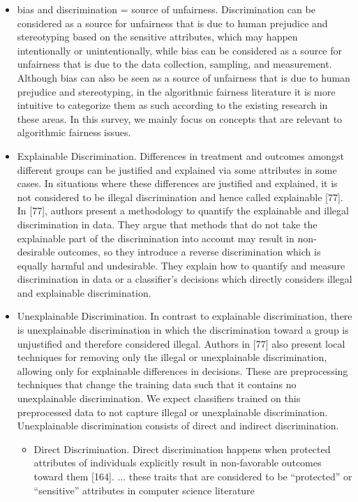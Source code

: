 \documentclass[12pt, a4paper, oneside]{book}   	%
\begin{document}
			\begin{itemize}
				\item bias and discrimination = source of unfairness. Discrimination can be considered as a source for unfairness that is due to human prejudice and stereotyping based on the sensitive attributes, which may happen intentionally or unintentionally, while bias can be considered as a source for unfairness that is due to the data collection, sampling, and measurement. Although bias can also be seen as a source of unfairness that is due to human prejudice and stereotyping, in the algorithmic fairness literature it is more intuitive to categorize them as such according to the existing research in these areas. In this survey, we mainly focus on concepts that are relevant to algorithmic fairness issues. \autocite{Mehrabi_2021}
				\item Explainable Discrimination. Differences in treatment and outcomes amongst different groups can be justified and explained via some attributes in some cases. In situations where these differences are justified and explained, it is not considered to be illegal discrimination and hence called explainable [77]. In [77], authors present a methodology to quantify the explainable and illegal discrimination in data. They argue that methods that do not take the explainable part of the discrimination into account may result in non-desirable outcomes, so they introduce a reverse discrimination which is equally harmful and undesirable. They explain how to quantify and measure discrimination in data or a classifier’s decisions which directly considers illegal and explainable discrimination.\autocite{Mehrabi_2021}
				\item Unexplainable Discrimination. In contrast to explainable discrimination, there is unexplainable discrimination in which the discrimination toward a group is unjustified and therefore considered illegal. Authors in [77] also present local techniques for removing only the illegal or unexplainable discrimination, allowing only for explainable differences in decisions. These are preprocessing techniques that change the training data such that it contains no unexplainable discrimination. We expect classifiers trained on this preprocessed data to not capture illegal or unexplainable discrimination. Unexplainable discrimination consists of direct and indirect discrimination.\autocite{Mehrabi_2021}
				\begin{itemize}
					\item Direct Discrimination. Direct discrimination happens when protected attributes of individuals explicitly result in non-favorable outcomes toward them [164]. ... these traits that are considered to be “protected” or “sensitive” attributes in computer science literature  \autocite{Mehrabi_2021}

\end{itemize}
\end{itemize}
\end{document}
